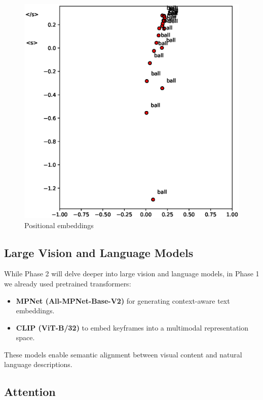 \documentclass[runningheads]{llncs}
\begin{document}
\begin{figure}
  \centering
  \includegraphics[width=.5\textwidth, clip=true, trim = 15mm 0mm 0mm 0mm]{../figures/pos_embeds.eps}
  \caption{Positional embeddings}\label{pos_embeds}\label{img:positional_embeddings}
\end{figure}

\subsection{Large Vision and Language Models}
While Phase 2 will delve deeper into large vision and language models, in Phase 1 we already used pretrained transformers:

\begin{itemize}
    \item \textbf{MPNet (All-MPNet-Base-V2)} for generating context-aware text embeddings.
    \item \textbf{CLIP (ViT-B/32)} to embed keyframes into a multimodal representation space.
\end{itemize}

These models enable semantic alignment between visual content and natural language descriptions.

\vspace{2\baselineskip plus 0.5\baselineskip minus 0.5\baselineskip} %

\subsection{Attention}
\end{document}
